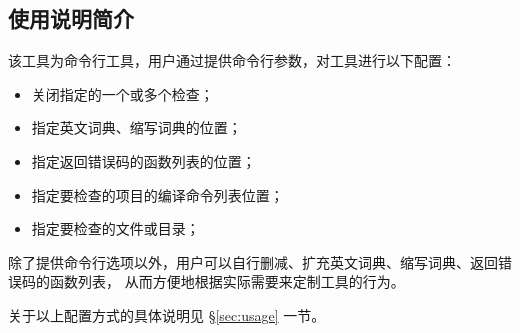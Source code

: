 \subsection{使用说明简介}
\label{sec:intro:usage}

该工具为命令行工具，用户通过提供命令行参数，对工具进行以下配置：

\begin{itemize}
    \item 关闭指定的一个或多个检查；
    \item 指定英文词典、缩写词典的位置；
    \item 指定返回错误码的函数列表的位置；
    \item 指定要检查的项目的编译命令列表位置；
    \item 指定要检查的文件或目录；
\end{itemize}

除了提供命令行选项以外，用户可以自行删减、扩充英文词典、缩写词典、返回错误码的函数列表，
从而方便地根据实际需要来定制工具的行为。

关于以上配置方式的具体说明见 \S\ref{sec:usage} 一节。
